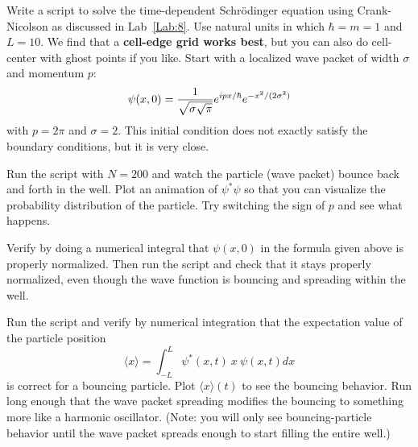 \begin{enumerate}
\begin{enumerate}
\probtwo \label{P:23.2}
\begin{enumerate}
\subprob \label{P:23.2a} 
    Write a script to solve the
    time-dependent Schr\"{o}dinger equation using
    Crank-Nicolson as discussed in Lab~\ref{Lab:8}. Use
    natural units in which $\hbar=m=1$ and $L=10$.  We find
    that a \textbf{cell-edge grid works best}, but you can also do cell-center with ghost
    points if you like. Start with a localized wave packet of
    width $\sigma$ and momentum $p$:
    \begin{equation}
        \psi(x,0) = {1 \over \sqrt{ \sigma \sqrt{\pi}}} e^{i p x / \hbar}
        e^{-x^2/(2 \sigma^2)}
    \end{equation}
    with $p=2 \pi$ and $\sigma=2$. This initial condition
    does not exactly satisfy the boundary conditions, but it
    is very close. 

   Run the script with $N=200$ and watch the particle (wave
    packet) bounce back and forth in the well. Plot an animation of
    $\psi^* \psi$ so that you can visualize the probability
    distribution of the particle.  Try switching the sign of
    $p$ and see what happens.





\subprob Verify by doing a numerical integral that
$\psi(x,0)$ in the formula given above is properly
normalized. Then run the script and check that it stays
properly normalized, even though the wave function is
bouncing and spreading within the well. 

\subprob \label{P:23.2c}
Run the script and verify by numerical integration that
the expectation value of the particle position
\begin{equation}
    \langle x\rangle = \int_{-L}^{L}  \psi^*(x,t)~ x~ \psi(x,t) dx
\end{equation}
is correct for a bouncing particle. Plot $\langle x \rangle(t)$ to
see the bouncing behavior. Run long enough that the wave packet
spreading modifies the bouncing to something more like a harmonic
oscillator. (Note: you will only see bouncing-particle behavior
until the wave packet spreads enough to start filling the entire
well.)


\end{enumerate}
\end{enumerate}
\end{enumerate}
